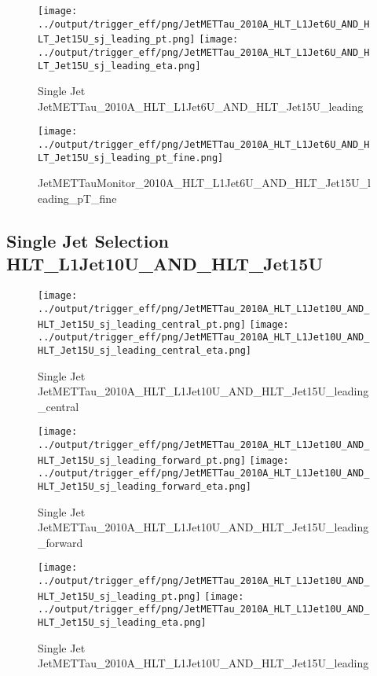 \documentclass[11pt]{article}
\begin{document}
\begin{figure}[ht]
\centering
\texttt{[image: ../output/trigger\_eff/png/JetMETTau\_2010A\_HLT\_L1Jet6U\_AND\_HLT\_Jet15U\_sj\_leading\_pt.png]}
\texttt{[image: ../output/trigger\_eff/png/JetMETTau\_2010A\_HLT\_L1Jet6U\_AND\_HLT\_Jet15U\_sj\_leading\_eta.png]}
\caption{Single Jet JetMETTau\_2010A\_HLT\_L1Jet6U\_AND\_HLT\_Jet15U\_leading}
\label{fig:jetmettau_sj_HLT_L1Jet6U_AND_HLT_Jet15U_leading}
\end{figure}

\begin{figure}[ht]
\centering
\texttt{[image: ../output/trigger\_eff/png/JetMETTau\_2010A\_HLT\_L1Jet6U\_AND\_HLT\_Jet15U\_sj\_leading\_pt\_fine.png]}
\caption{JetMETTauMonitor\_2010A\_HLT\_L1Jet6U\_AND\_HLT\_Jet15U\_leading\_pT\_fine}
\label{fig:jetmettau_sj_HLT_L1Jet6U_AND_HLT_Jet15U_leading_pT_fine}
\end{figure}
\clearpage


\newpage
\subsection{Single Jet Selection HLT\_L1Jet10U\_AND\_HLT\_Jet15U}
\begin{figure}[ht]
\centering
\texttt{[image: ../output/trigger\_eff/png/JetMETTau\_2010A\_HLT\_L1Jet10U\_AND\_HLT\_Jet15U\_sj\_leading\_central\_pt.png]}
\texttt{[image: ../output/trigger\_eff/png/JetMETTau\_2010A\_HLT\_L1Jet10U\_AND\_HLT\_Jet15U\_sj\_leading\_central\_eta.png]}
\caption{Single Jet JetMETTau\_2010A\_HLT\_L1Jet10U\_AND\_HLT\_Jet15U\_leading\_central}
\label{fig:jetmettau_sj_HLT_L1Jet10U_AND_HLT_Jet15U_leading_central}
\end{figure}

\begin{figure}[ht]
\centering
\texttt{[image: ../output/trigger\_eff/png/JetMETTau\_2010A\_HLT\_L1Jet10U\_AND\_HLT\_Jet15U\_sj\_leading\_forward\_pt.png]}
\texttt{[image: ../output/trigger\_eff/png/JetMETTau\_2010A\_HLT\_L1Jet10U\_AND\_HLT\_Jet15U\_sj\_leading\_forward\_eta.png]}
\caption{Single Jet JetMETTau\_2010A\_HLT\_L1Jet10U\_AND\_HLT\_Jet15U\_leading\_forward}
\label{fig:jetmettau_sj_HLT_L1Jet10U_AND_HLT_Jet15U_leading_forward}
\end{figure}

\begin{figure}[ht]
\centering
\texttt{[image: ../output/trigger\_eff/png/JetMETTau\_2010A\_HLT\_L1Jet10U\_AND\_HLT\_Jet15U\_sj\_leading\_pt.png]}
\texttt{[image: ../output/trigger\_eff/png/JetMETTau\_2010A\_HLT\_L1Jet10U\_AND\_HLT\_Jet15U\_sj\_leading\_eta.png]}
\caption{Single Jet JetMETTau\_2010A\_HLT\_L1Jet10U\_AND\_HLT\_Jet15U\_leading}
\label{fig:jetmettau_sj_HLT_L1Jet10U_AND_HLT_Jet15U_leading}
\end{figure}
\end{document}

